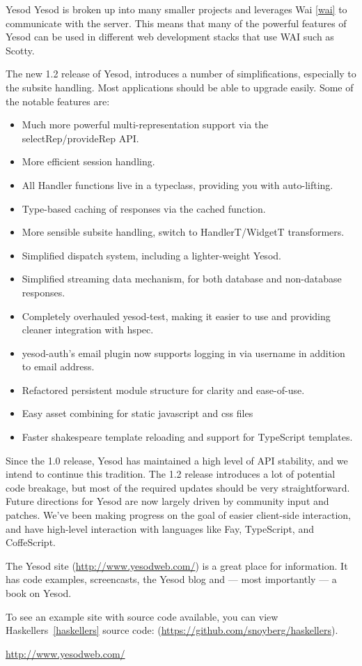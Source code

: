 \begin{hcarentry}{Yesod}
Yesod is broken up into many smaller projects and leverages Wai \cref{wai} to communicate with the server. This means that many of the powerful features of Yesod can be used in different web development stacks that use WAI such as Scotty.

The new 1.2 release of Yesod, introduces a number of simplifications, especially to the subsite handling. Most applications should be able to upgrade easily. Some of the notable features are:

\begin{itemize}
\item Much more powerful multi-representation support via the selectRep/provideRep API.
\item More efficient session handling.
\item All Handler functions live in a typeclass, providing you with auto-lifting.
\item Type-based caching of responses via the cached function.
\item More sensible subsite handling, switch to HandlerT/WidgetT transformers.
\item Simplified dispatch system, including a lighter-weight Yesod.
\item Simplified streaming data mechanism, for both database and non-database responses.
\item Completely overhauled yesod-test, making it easier to use and providing cleaner integration with hspec.
\item yesod-auth's email plugin now supports logging in via username in addition to email address.
\item Refactored persistent module structure for clarity and ease-of-use.
\item Easy asset combining for static javascript and css files
\item Faster shakespeare template reloading and support for TypeScript templates.
\end{itemize}

Since the 1.0 release, Yesod has maintained a high level of API stability, and we intend to continue this tradition. The 1.2 release introduces a lot of potential code breakage, but most of the required updates should be very straightforward. Future directions for Yesod are now largely driven by community input and patches. We've been making progress on the goal of easier client-side interaction, and have high-level interaction with languages like Fay, TypeScript, and CoffeScript.

The Yesod site (\url{http://www.yesodweb.com/}) is a great place for information. It has code examples, screencasts, the Yesod blog and --- most importantly --- a book on Yesod.

To see an example site with source code available, you can view Haskellers~\cref{haskellers} source code: (\url{https://github.com/snoyberg/haskellers}).

\FurtherReading 
\url{http://www.yesodweb.com/} 
\end{hcarentry} 
